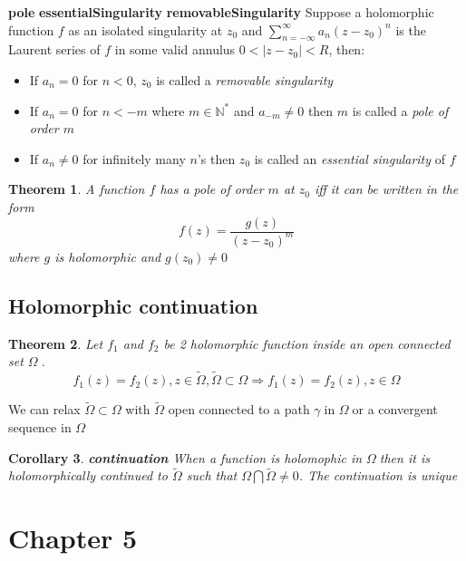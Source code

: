 \documentclass{article}
\newtheorem{theorem}{Theorem}[section]
\newtheorem{corollary}[theorem]{Corollary}
\newenvironment{definition}[1][Definition]{\begin{trivlist}
\item[\hskip \labelsep {\bfseries #1}]}{\end{trivlist}}
\newcommand{\N}{\mathbb{N}}
\newcommand{\OO}{$ \Omega \;$}
\newcommand{\GG}{$ \gamma \;$}
\newcommand{\SumII}{\sum_{n = -\infty}^\infty}
\newcommand{\LSeries}{\SumII a_n(z-z_0)^n}
\begin{document}
\begin{definition} \label{pole} \textbf{pole} \label{essentialSingularity} \textbf{essentialSingularity} \label{removableSingularity} \textbf{removableSingularity}
    Suppose a holomorphic function $f$ as an isolated singularity at $z_0$ and $\LSeries$ is the Laurent series of $f$ in
    some valid annulus $0 < |z-z_0| < R$, then:
    \begin{itemize}
        \item If $a_n = 0$ for $n < 0$, $z_0$ is called a \textit{removable singularity}
        \item If $a_n = 0$ for $n < -m$ where $m \in \N^*$ and $a_{-m} \neq 0$ then $m$ is called a \textit{pole of order $m$}
        \item If $a_n \neq 0$ for infinitely many $n$'s then $z_0$ is called an \textit{essential singularity} of $f$
    \end{itemize}
\end{definition}

\begin{theorem}
    A function $f$ has a pole of order $m$ at $z_0$ iff it can be written in the form
    \[f(z) = \frac{g(z)}{(z-z_0)^m}\]
    where $g$ is holomorphic and $g(z_0) \neq 0$
\end{theorem}

\subsection*{Holomorphic continuation}

\begin{theorem}
    Let $f_1$ and $f_2$ be 2 holomorphic function inside an open connected set \OO.
    $$f_1(z) = f_2(z), z \in \tilde{\Omega}, \tilde{\Omega} \subset \Omega \Rightarrow f_1(z) = f_2(z), z \in \Omega$$
\end{theorem}

We can relax $\tilde{\Omega} \subset \Omega$ with $\tilde{\Omega}$ open connected to a path \GG in \OO or
a convergent sequence in \OO

\begin{corollary} \label{continuation} \textbf{continuation}
    When a function is holomophic in \OO then it is \textit{holomorphically} continued to $\tilde{\Omega}$ such that
    $\Omega \bigcap \tilde{\Omega} \neq 0$.
    The continuation is unique
\end{corollary}

\section*{Chapter 5} %
\setcounter{section}{5}
\end{document}
